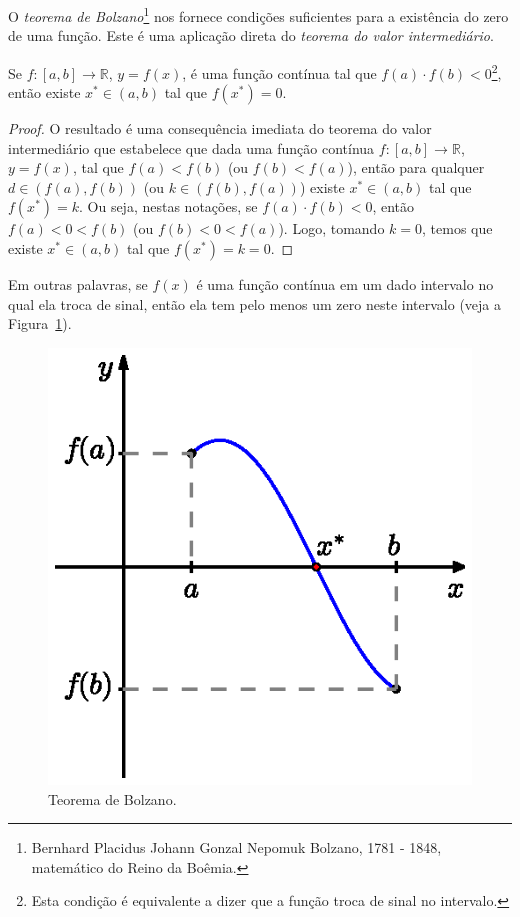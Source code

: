O \emph{teorema de Bolzano}\footnote{Bernhard Placidus Johann Gonzal Nepomuk Bolzano, 1781 - 1848, matemático do Reino da Boêmia.} nos fornece condições suficientes para a existência do zero de uma função. Este é uma aplicação direta do \emph{teorema do valor intermediário}.

\begin{teo}\label{teo:teorema_de_Bolzano}
  Se $f:[a, b]\to\mathbb{R}$, $y = f(x)$, é uma função contínua tal que $f(a)\cdot f(b) < 0$\footnote{Esta condição é equivalente a dizer que a função troca de sinal no intervalo.}, então existe $x^*\in (a, b)$ tal que $f(x^*) = 0$.
\end{teo}
\begin{proof}
  O resultado é uma consequência imediata do teorema do valor intermediário que estabelece que dada uma função contínua $f:[a, b]\to\mathbb{R}$, $y = f(x)$, tal que $f(a) < f(b)$ (ou $f(b) < f(a)$), então para qualquer $d\in \left(f(a), f(b)\right)$ (ou $k\in \left(f(b), f(a)\right)$) existe $x^*\in (a, b)$ tal que $f(x^*) = k$. Ou seja, nestas notações, se $f(a)\cdot f(b) < 0$, então $f(a) < 0 < f(b)$ (ou $f(b) < 0 < f(a)$). Logo, tomando $k = 0$, temos que existe $x^*\in (a, b)$ tal que $f(x^*) = k = 0$.
\end{proof}

Em outras palavras, se $f(x)$ é uma função contínua em um dado intervalo no qual ela troca de sinal, então ela tem pelo menos um zero neste intervalo (veja a Figura~\ref{fig:teorema_de_Bolzano}).

\begin{figure}
  \centering
  \includegraphics{./cap_equacao1d/pics/teorema_de_Bolzano/teorema_de_Bolzano.eps}
  \caption{Teorema de Bolzano.}
  \label{fig:teorema_de_Bolzano}
\end{figure}


